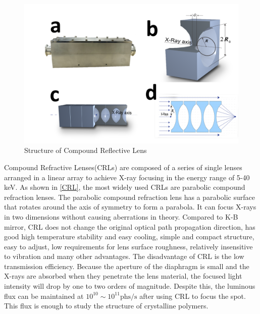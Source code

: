 \documentclass{Head}
\begin{document}
\begin{figure}
    \centering
    \includegraphics[scale=0.5]{Figures/Fig2CRL.png}
    \caption{Structure of Compound Reflective Lens}
    \label{CRL}
\end{figure}
Compound Refractive Lenses(CRLs) are composed of a series of single lenses arranged in a linear array to achieve X-ray focusing in the energy range of 5-40 keV.
As shown in \autoref{CRL}, the most widely used CRLs are parabolic compound refraction lenses.
The parabolic compound refraction lens has a parabolic surface that rotates around the axis of symmetry to form a parabola.
It can focus X-rays in two dimensions without causing aberrations in theory.
Compared to K-B mirror, CRL does not change the original optical path propagation direction, has good high temperature stability and easy cooling, simple and compact structure, easy to adjust, low requirements for lens surface roughness, relatively insensitive to vibration and many other advantages.
The disadvantage of CRL is the low transmission efficiency.
Because the aperture of the diaphragm is small and the X-rays are absorbed when they penetrate the lens material, the focused light intensity will drop by one to two orders of magnitude.
Despite this, the luminous flux can be maintained at $\mathrm{10^{10}\sim 10^{11} phs/s}$ after using CRL to focus the spot.
This flux is enough to study the structure of crystalline polymers.
\end{document}
